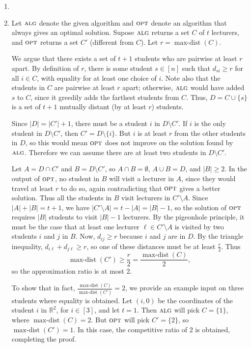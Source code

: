 \documentclass[11pt]{article}
\newcommand{\R}{\mathbb{R}}
\newcommand{\alg}{\textsc{alg}}
\newcommand{\opt}{\textsc{opt}}
\begin{document}
\begin{enumerate}[(1)]
  \item 
  \item Let $\alg$ denote the given algorithm and $\opt$ denote an algorithm that always gives an optimal solution.
  Supose $\alg$ returns a set $C$ of $t$ lecturers, and $\opt$ returns a set $C'$ (different from $C$).
  Let $r = \operatorname{max-dist}(C)$.

  We argue that there exists a set of $t+1$ students who are pairwise at least $r$ apart.
  By definition of $r$, there is some student $s \in [n]$ such that $d_{si} \geq r$ for all $i \in C$, with equality for at least one choice of $i$.
  Note also that the students in $C$ are pairwise at least $r$ apart; otherwise, $\alg$ would have added $s$ to $C$, since it greedily adds the farthest students from $C$.
  Thus, $D = C \cup \{s\}$ is a set of $t+1$ mutually distant (by at least $r$) students.

  Since $|D| = |C'| + 1$, there must be a student $i$ in $D \setminus C'$.
  If $i$ is the only student in $D \setminus C'$, then $C' = D \setminus \{i\}$.
  But $i$ is at least $r$ from the other students in $D$, so this would mean $\opt$ does not improve on the solution found by $\alg$.
  Therefore we can assume there are at least two students in $D \setminus C'$.

  Let $A = D \cap C'$ and $B = D \setminus C'$, so $A \cap B = \emptyset$, $A \cup B = D$, and $|B| \geq 2$.
  In the output of $\opt$, no student in $B$ will visit a lecturer in $A$, since they would travel at least $r$ to do so, again contradicting that $\opt$ gives a better solution.
  Thus all the students in $B$ visit lecturers in $C' \setminus A$.
  Since $|A| + |B| = t + 1$, we have $|C' \setminus A| = t - |A| = |B| - 1$, so the solution of $\opt$ requires $|B|$ students to visit $|B| - 1$ lecturers.
  By the pigeonhole principle, it must be the case that at least one lecturer $\ell \in C' \setminus A$ is visited by two students $i$ and $j$ in $B$.
  Now, $d_{ij} \geq r$ because $i$ and $j$ are in $D$.
  By the triangle inequality, $d_{i \ell} + d_{j \ell} \geq r$, so one of these distances must be at least $\frac{r}{2}$.
  Thus \[\operatorname{max-dist}(C') \geq \frac{r}{2} = \frac{\operatorname{max-dist}(C)}{2},\] so the approximation ratio is at most 2.

  To show that in fact, $\frac{\operatorname{max-dist}(C)}{\operatorname{max-dist}(C')} = 2$, we provide an example input on three students where equality is obtained.
  Let $(i, 0)$ be the coordinates of the student $i$ in $\R^2$, for $i \in [3]$, and let $t = 1$.
  Then $\alg$ will pick $C = \{1\}$, where $\operatorname{max-dist}(C) = 2$.
  But $\opt$ will pick $C' = \{2\}$, so $\operatorname{max-dist}(C') = 1$.
  In this case, the competitive ratio of $2$ is obtained, completing the proof.
\end{enumerate}
\end{document}
